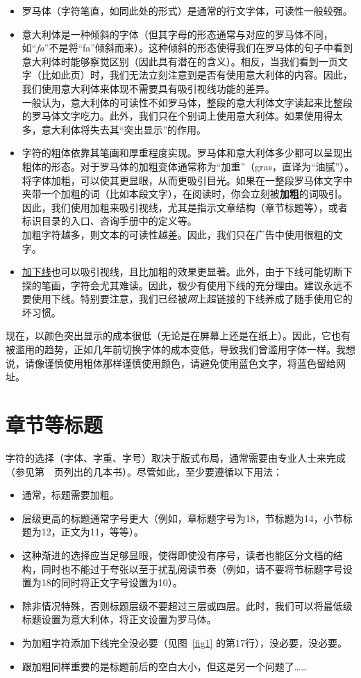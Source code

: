 \begin{itemize}
    \item 罗马体（字符笔直，如同此处的形式）是通常的行文字体，可读性一般较强。
    \item 意大利体是一种倾斜的字体（但其字母的形态通常与对应的罗马体不同，如``\emph{fa}''不是将``fa''倾斜而来）。这种倾斜的形态使得我们在罗马体的句子中看到意大利体时能够察觉区别（因此具有潜在的含义）。相反，当我们看到一页文字（比如此页）时，我们无法立刻注意到是否有使用意大利体的内容。因此，我们使用意大利体来体现不需要具有吸引视线功能的差异。\\
    一般认为，意大利体的可读性不如罗马体，整段的意大利体文字读起来比整段的罗马体文字吃力。此外，我们只在个别词上使用意大利体。如果使用得太多，意大利体将失去其``突出显示''的作用。
    \item 字符的粗体依靠其笔画和厚重程度实现。罗马体和意大利体多少都可以呈现出粗体的形态。对于罗马体的加粗变体通常称为``加重''（gras，直译为``油腻''）。将字体加粗，可以使其更显眼，从而更吸引目光。如果在一整段罗马体文字中夹带一个加粗的词（比如本段文字），在阅读时，你会立刻被\textbf{加粗}的词吸引。因此，我们使用加粗来吸引视线，尤其是指示文章结构（章节标题等），或者标识目录的入口、咨询手册中的定义等。\\
    加粗字符越多，则文本的可读性越差。因此，我们只在广告中使用很粗的文字。
    \item \underline{加下线}也可以吸引视线，且比加粗的效果更显著。此外，由于下线可能切断下探的笔画，字符会尤其难读。因此，极少有使用下线的充分理由。建议永远不要使用下线。特别要注意，我们已经被\emph{网}上超链接的下线养成了随手使用它的坏习惯。
\end{itemize}

现在，以颜色突出显示的成本很低（无论是在屏幕上还是在纸上）。因此，它也有被滥用的趋势，正如几年前切换字体的成本变低，导致我们曾滥用字体一样。我想说，请像谨慎使用粗体那样谨慎使用颜色，请避免使用蓝色文字，将蓝色留给网址。

\section{章节等标题}

字符的选择（字体、字重、字号）取决于版式布局，通常需要由专业人士来完成（参见第~\pageref{sec8.5}~页列出的几本书）。尽管如此，至少要遵循以下用法：

\begin{itemize}
    \item 通常，标题需要加粗。
    \item 层级更高的标题通常字号更大（例如，章标题字号为18，节标题为14，小节标题为12，正文为11，等等）。
    \item 这种渐进的选择应当足够显眼，使得即使没有序号，读者也能区分文档的结构，同时也不能过于夸张以至于扰乱阅读节奏（例如，请不要将节标题字号设置为18的同时将正文字号设置为10）。
    \item 除非情况特殊，否则标题层级不要超过三层或四层。此时，我们可以将最低级标题设置为意大利体，将正文设置为罗马体。
    \item 为加粗字符添加下线完全没必要（见图~\ref{fig1} 的第17行），没必要，没必要。
    \item 跟加粗同样重要的是标题前后的空白大小，但这是另一个问题了……
\end{itemize}

